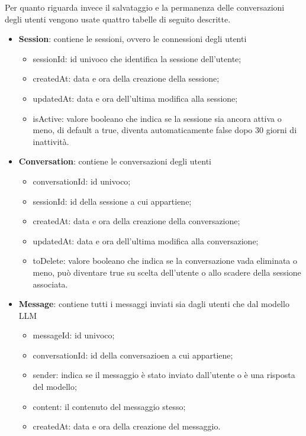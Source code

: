 Per quanto riguarda invece il salvataggio e la permanenza delle conversazioni degli utenti vengono usate quattro tabelle di seguito descritte.
\begin{itemize}
    \item \textbf{Session}: contiene le sessioni, ovvero le connessioni degli utenti
    \begin{itemize}
        \item sessionId: id univoco che identifica la sessione dell'utente;
        \item createdAt: data e ora della creazione della sessione;
        \item updatedAt: data e ora dell'ultima modifica alla sessione;
        \item isActive: valore booleano che indica se la sessione sia ancora attiva o meno, di default a true, diventa automaticamente false dopo 30 giorni di inattività.
    \end{itemize} 
    \item \textbf{Conversation}: contiene le conversazioni degli utenti
    \begin{itemize}
        \item conversationId: id univoco;
        \item sessionId: id della sessione a cui appartiene;
        \item createdAt: data e ora della creazione della conversazione;
        \item updatedAt: data e ora dell'ultima modifica alla conversazione;
        \item toDelete: valore booleano che indica se la conversazione vada eliminata o meno, può diventare true su scelta dell'utente o allo scadere della sessione associata.
    \end{itemize} 
    \item \textbf{Message}: contiene tutti i messaggi inviati sia dagli utenti che dal modello LLM
    \begin{itemize}
        \item messageId: id univoco;
        \item conversationId: id della conversazioen a cui appartiene;
        \item sender: indica se il messaggio è stato inviato dall'utente o è una risposta del modello;
        \item content: il contenuto del messaggio stesso;
        \item createdAt: data e ora della creazione del messaggio.
    \end{itemize} 

\end{itemize}
